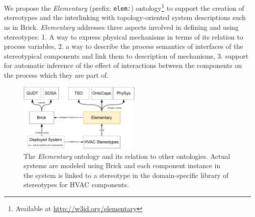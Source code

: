 \documentclass[sigconf]{acmart}
\begin{document}
We propose the \emph{Elementary} (prefix: \texttt{elem:}) ontology\footnote{Available at \url{http://w3id.org/elementary}} to support the creation of stereotypes and the interlinking with topology-oriented system descriptions such as in Brick.
%
\emph{Elementary} addresses three aspects involved in defining and using stereotypes: 1. A way to express physical mechanisms in terms of its relation to process variables, 2. a way to describe the process semantics of interfaces of the stereotypical components and link them to description of mechanisms, 3. support for automatic inference of the effect of interactions between the components on the process which they are part of. 





\begin{figure}[t]
\centering
\includegraphics[width=6cm]{figures/a_overview_of_ontologies_involved.pdf}
\caption{The \emph{Elementary} ontology and its relation to other ontologies. Actual systems are modeled using Brick and each component instance in the system is linked to a stereotype in the domain-specific library of stereotypes for HVAC components.}
\label{fig:overview}
\end{figure}
\end{document}
